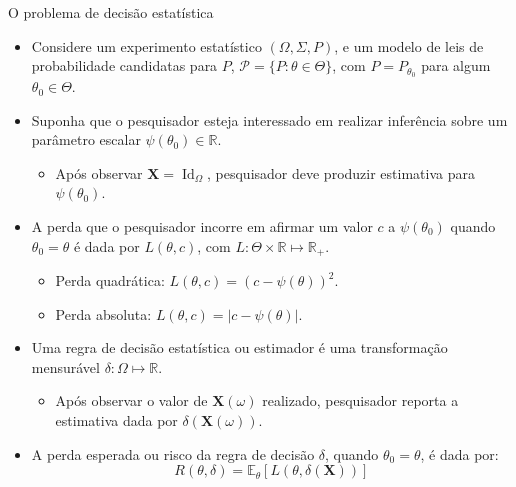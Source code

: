 \documentclass[11pt]{beamer}
\begin{document}
	\begin{frame}{O problema de decisão estatística}
	\begin{itemize}
		\item Considere um experimento estatístico $(\Omega,\Sigma, P)$, e um modelo de leis de probabilidade candidatas para $P$, $\mathcal{P} = \{P:\theta \in \Theta\}$, com $P=P_{\theta_0}$ para algum $\theta_0 \in \Theta$.
		\item Suponha que o pesquisador esteja interessado em realizar inferência sobre um parâmetro  escalar $\psi(\theta_0) \in \mathbb{R}$.
		\begin{itemize}
					\item Após observar $\boldsymbol{X} =\operatorname{Id}_\Omega$, pesquisador deve produzir  estimativa para $\psi(\theta_0)$.
		\end{itemize}
		\item A {\color{blue}perda} que o pesquisador incorre em afirmar um valor $c$ a $\psi(\theta_0)$ quando $\theta_0 = \theta$ é dada por $L(\theta,c)$, com $L: \Theta \times \mathbb{R} \mapsto \mathbb{R}_+$.
		\begin{itemize}
			\item Perda quadrática: $L(\theta,c)= (c-\psi(\theta))^2$.
			\item Perda absoluta: $L(\theta,c) = |c-\psi(\theta)|$.
		\end{itemize}
		\item Uma {\color{blue}regra de decisão estatística} ou estimador é uma transformação mensurável $\delta:\Omega \mapsto \mathbb{R}$.
		\begin{itemize}
			\item Após observar o valor de $\boldsymbol{X}(\omega)$ realizado,  pesquisador reporta a estimativa dada por $\delta(\boldsymbol{X}(\omega))$.
		\end{itemize}
		\item A perda esperada ou risco da regra de decisão $\delta$, quando $\theta_0=\theta$, é dada por:
	$$R(\theta, \delta)=\mathbb{E}_\theta[L(\theta, \delta(\boldsymbol{X}))]$$

	\end{itemize}
	\end{frame}
	
\end{document}
